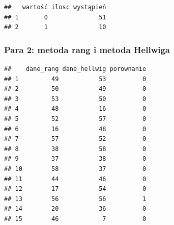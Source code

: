\documentclass[12pt,a4paper]{report}
\begin{document}
{\begin{verbatim}
##   wartość ilosc wystąpień
## 1       0              51
## 2       1              10
\end{verbatim}

\subsubsection{Para 2: metoda rang i metoda
Hellwiga}\label{para-2-metoda-rang-i-metoda-hellwiga}

\begin{Shaded}
\begin{Highlighting}[]
\NormalTok{(}\NormalTok{,}\NormalTok{)}

\NormalTok{:}
  \NormalTok{\}}
\NormalTok{\}}
\NormalTok{)}
\end{Highlighting}
\end{Shaded}

\begin{verbatim}
##    dane_rang dane_hellwig porownanie
## 1         49           53          0
## 2         50           49          0
## 3         53           50          0
## 4         48           16          0
## 5         52           57          0
## 6         16           48          0
## 7         57           52          0
## 8         38           58          0
## 9         37           38          0
## 10        58           37          0
## 11        44           46          0
## 12        17           54          0
## 13        56           56          1
## 14        20           36          0
## 15        46            7          0
\end{verbatim}

\begin{Shaded}
\begin{Highlighting}[]
\NormalTok{(}
\NormalTok{(}\NormalTok{,}\NormalTok{)}
\end{Highlighting}
\end{Shaded}

}
\end{document}
